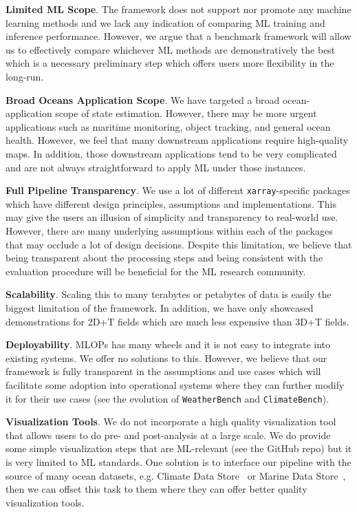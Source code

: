 \textbf{Limited ML Scope}. 
The framework does not support nor promote any machine learning methods and we lack any indication of comparing ML training and inference performance. 
However, we argue that a benchmark framework will allow us to effectively compare whichever ML methods are demonstratively the best which is a necessary preliminary step which offers users more flexibility in the long-run.

\textbf{Broad Oceans Application Scope}. 
We have targeted a broad ocean-application scope of state estimation.
However, there may be more urgent applications such as maritime monitoring, object tracking, and general ocean health.
However, we feel that many downstream applications require high-quality maps.
In addition, those downstream applications tend to be very complicated and are not always straightforward to apply ML under those instances.

\textbf{Full Pipeline Transparency}. We use a lot of different \texttt{xarray}-specific packages which have different design principles, assumptions and implementations. This may give the users an illusion of simplicity and transparency to real-world use. However, there are many underlying assumptions within each of the packages that may occlude a lot of design decisions.
Despite this limitation, we believe that being transparent about the processing steps and being consistent with the evaluation procedure will be beneficial for the ML research community.

\textbf{Scalability}. Scaling this to many terabytes or petabytes of data is easily the biggest limitation of the framework. In addition, we have only showcased demonstrations for 2D+T fields which are much less expensive than 3D+T fields.

\textbf{Deployability}. MLOPs has many wheels and it is not easy to integrate into existing systems. We offer no solutions to this. 
However, we believe that our framework is fully transparent in the assumptions and use cases which will facilitate some adoption into operational systems where they can further modify it for their use cases (see the evolution of \texttt{WeatherBench} and \texttt{ClimateBench}).

\textbf{Visualization Tools}.
We do not incorporate a high quality visualization tool that allows users to do pre- and post-analysis at a large scale. 
We do provide some simple visualization steps that are ML-relevant (see the GitHub repo) but it is very limited to ML standards.
One solution is to interface our pipeline with the source of many ocean datasets, e.g. Climate Data Store~\citep{CDSREANALYSISSST} or Marine Data Store~\citep{MDSOCEANPHYSICS}, then we can offset this task to them where they can offer better quality visualization tools.


